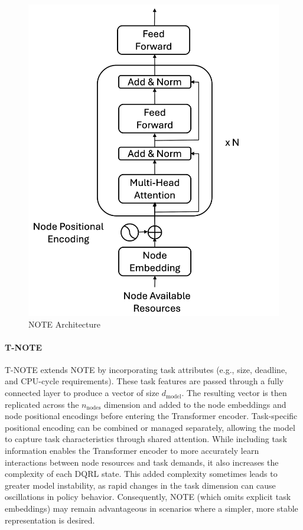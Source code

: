 \documentclass[preprint,12pt]{elsarticle}
\begin{document}
\begin{figure}[H]
    \centering
    \includegraphics[width=0.6\linewidth]{figs/nodeformer_architecture.png}
    \caption{NOTE Architecture}
    \label{fig:enter-label}
\end{figure}

\paragraph{T-NOTE}
\label{par:T-NOTE}

T-NOTE extends NOTE by incorporating task attributes (e.g., size, deadline, and CPU-cycle requirements). These task features are passed through a fully connected layer to produce a vector of size \(d_{\text{model}}\). The resulting vector is then replicated across the \(n_{\text{nodes}}\) dimension and added to the node embeddings and node positional encodings before entering the Transformer encoder. Task-specific positional encoding can be combined or managed separately, allowing the model to capture task characteristics through shared attention. While including task information enables the Transformer encoder to more accurately learn interactions between node resources and task demands, it also increases the complexity of each DQRL state. This added complexity sometimes leads to greater model instability, as rapid changes in the task dimension can cause oscillations in policy behavior. Consequently, NOTE (which omits explicit task embeddings) may remain advantageous in scenarios where a simpler, more stable representation is desired.
\end{document}
